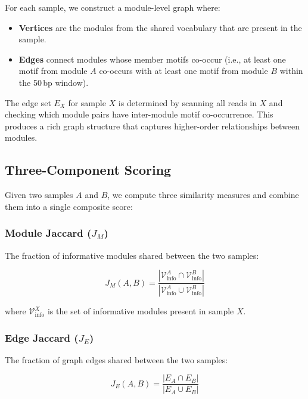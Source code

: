 \documentclass{../yalumba}
\begin{document}
For each sample, we construct a module-level graph where:

\begin{itemize}
  \item \textbf{Vertices} are the modules from the shared vocabulary that are
        present in the sample.
  \item \textbf{Edges} connect modules whose member motifs co-occur (i.e.,
        at least one motif from module $A$ co-occurs with at least one motif
        from module $B$ within the 50\,bp window).
\end{itemize}

The edge set $E_X$ for sample $X$ is determined by scanning all reads in $X$
and checking which module pairs have inter-module motif co-occurrence.  This
produces a rich graph structure that captures higher-order relationships between
modules.

\subsection{Three-Component Scoring}
\label{sec:scoring}

Given two samples $A$ and $B$, we compute three similarity measures and combine
them into a single composite score:

\subsubsection{Module Jaccard ($J_M$)}

The fraction of informative modules shared between the two samples:

\begin{equation}
  J_M(A, B) = \frac{|\mathcal{V}_{\text{info}}^A \cap \mathcal{V}_{\text{info}}^B|}
                    {|\mathcal{V}_{\text{info}}^A \cup \mathcal{V}_{\text{info}}^B|}
  \label{eq:module-jaccard}
\end{equation}

\noindent where $\mathcal{V}_{\text{info}}^X$ is the set of informative modules
present in sample $X$.

\subsubsection{Edge Jaccard ($J_E$)}

The fraction of graph edges shared between the two samples:

\begin{equation}
  J_E(A, B) = \frac{|E_A \cap E_B|}{|E_A \cup E_B|}
  \label{eq:edge-jaccard}
\end{equation}
\end{document}
